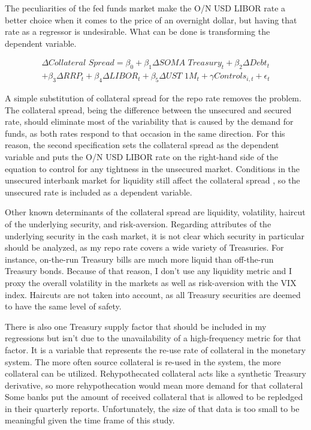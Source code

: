 \documentclass[11pt,a4paper,english,oneside]{article}
\begin{document}
The peculiarities of the fed funds market make the O/N USD LIBOR rate a better choice when it comes to the price of an overnight dollar, but having that rate as a regressor is undesirable. What can be done is transforming the dependent variable.

\begin{equation} \label{eq:2}
  \begin{gathered}
    \Delta \textit{Collateral Spread} = \beta_0 + \beta_1 \Delta \textit{SOMA Treasury}_t + \beta_2 \Delta \textit{Debt}_t \\ + \beta_3 \Delta \textit{RRP}_t + \beta_4 \Delta \textit{LIBOR}_t + \beta_5 \Delta \textit{UST 1M}_t + \gamma \textit{Controls}_{i,t} + \epsilon_{t}
  \end{gathered}
\end{equation}

A simple substitution of collateral spread for the repo rate removes the problem. The collateral spread, being the difference between the unsecured and secured rate, should eliminate most of the variability that is caused by the demand for funds, as both rates respond to that occasion in the same direction. For this reason, the second specification sets the collateral spread as the dependent variable and puts the O/N USD LIBOR rate on the right-hand side of the equation to control for any tightness in the unsecured market. Conditions in the unsecured interbank market for liquidity still affect the collateral spread \citet{nyborg2019a}, so the unsecured rate is included as a dependent variable.

Other known determinants of the collateral spread are liquidity, volatility, haircut of the underlying security, and risk-aversion. Regarding attributes of the underlying security in the cash market, it is not clear which security in particular should be analyzed, as my repo rate covers a wide variety of Treasuries. For instance, on-the-run Treasury bills are much more liquid than off-the-run Treasury bonds. Because of that reason, I don't use any liquidity metric and I proxy the overall volatility in the markets as well as risk-aversion with the VIX index. Haircuts are not taken into account, as all Treasury securities are deemed to have the same level of safety.

There is also one Treasury supply factor that should be included in my regressions but isn't due to the unavailability of a high-frequency metric for that factor. It is a variable that represents the re-use rate of collateral in the monetary system. The more often source collateral is re-used in the system, the more collateral can be utilized. Rehypothecated collateral acts like a synthetic Treasury derivative, so more rehypothecation would mean more demand for that collateral  Some banks put the amount of received  collateral that is allowed to be repledged in their quarterly reports. Unfortunately, the size of that data is too small to be meaningful given the time frame of this study.
\end{document}
